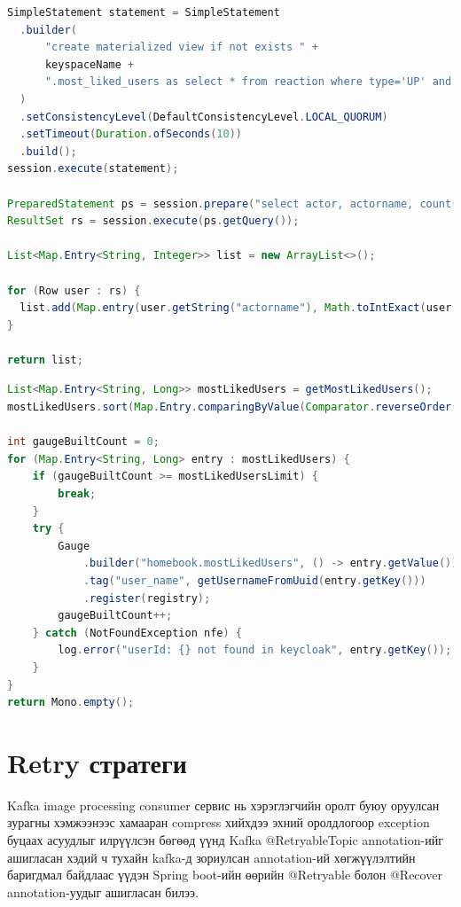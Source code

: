 \begin{lstlisting}[language=Java, frame=single, caption=Materialized view үүсгэн уншилт хийж буй байдал]
SimpleStatement statement = SimpleStatement
  .builder(
      "create materialized view if not exists " +
      keyspaceName +
      ".most_liked_users as select * from reaction where type='UP' and actor is not null and activityid is not null and type is not null and parent is not null and id is not null primary key(actor, activityid, type, parent, id);"
  )
  .setConsistencyLevel(DefaultConsistencyLevel.LOCAL_QUORUM)
  .setTimeout(Duration.ofSeconds(10))
  .build();
session.execute(statement);

PreparedStatement ps = session.prepare("select actor, actorname, count(*) as likes_count from most_liked_users group by actor");
ResultSet rs = session.execute(ps.getQuery());

List<Map.Entry<String, Integer>> list = new ArrayList<>();

for (Row user : rs) {
  list.add(Map.entry(user.getString("actorname"), Math.toIntExact(user.getLong("likes_count"))));
}

return list;
\end{lstlisting}
\pagebreak
\begin{lstlisting}[language=Java, frame=single, caption=Keycloak-аас хэрэглэгчийн мэдээллийг авч буй байдал]
List<Map.Entry<String, Long>> mostLikedUsers = getMostLikedUsers();
mostLikedUsers.sort(Map.Entry.comparingByValue(Comparator.reverseOrder()));

int gaugeBuiltCount = 0;
for (Map.Entry<String, Long> entry : mostLikedUsers) {
    if (gaugeBuiltCount >= mostLikedUsersLimit) {
        break;
    }
    try {
        Gauge
            .builder("homebook.mostLikedUsers", () -> entry.getValue())
            .tag("user_name", getUsernameFromUuid(entry.getKey()))
            .register(registry);
        gaugeBuiltCount++;
    } catch (NotFoundException nfe) {
        log.error("userId: {} not found in keycloak", entry.getKey());
    }
}
return Mono.empty();
\end{lstlisting}

\pagebreak

\section{Retry стратеги}
Kafka image processing consumer сервис нь хэрэглэгчийн оролт буюу оруулсан зурагны хэмжээнээс хамааран compress хийхдээ эхний оролдлогоор exception буцаах асуудлыг илрүүлсэн бөгөөд үүнд Kafka @RetryableTopic annotation-ийг ашигласан хэдий ч тухайн kafka-д зориулсан annotation-ий хөгжүүлэлтийн баригдмал байдлаас үүдэн Spring boot-ийн өөрийн @Retryable болон @Recover annotation-уудыг ашигласан билээ. 

